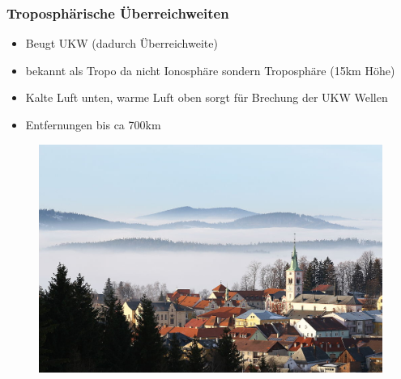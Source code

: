 \begin{frame}
    \frametitle{Troposphärische Überreichweiten}
    \begin{itemize}
      \item Beugt UKW (dadurch Überreichweite)
      \item bekannt als Tropo da nicht Ionosphäre sondern Troposphäre (15km Höhe)
      \item Kalte Luft unten, warme Luft oben sorgt für Brechung der UKW Wellen
      \item Entfernungen bis ca 700km
    \end{itemize}
    	\begin{center}
        \begin{figure}
      \includegraphics[width=.65\textwidth,height=.5\textheight,keepaspectratio]{e09/tropo.jpg}
    \end{figure}
    \end{center}
\end{frame}


%

